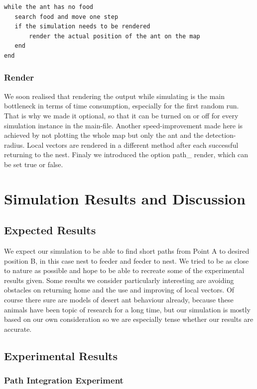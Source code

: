 \documentclass[11pt]{article}
\begin{document}
\begin{lstlisting}
while the ant has no food
   search food and move one step
   if the simulation needs to be rendered
       render the actual position of the ant on the map
   end
end
\end{lstlisting}

\subsubsection{Render}
We soon realised that rendering the output while simulating is the main bottleneck in terms of time consumption, especially for the first random run. That is why we made it optional, so that it can be turned on or off for every simulation instance in the main-file. Another speed-improvement made here is achieved by not plotting the whole map but only the ant and the detection-radius. Local vectors are rendered in a different method after each successful returning to the nest. Finaly we introduced the option path\_ render, which can be set true or false.

\newpage
\section{Simulation Results and Discussion}
\subsection{Expected Results}
We expect our simulation to be able to find short paths from Point A to desired position B, in this case nest to feeder and feeder to nest. We tried to be as close to nature as possible and hope to be able to recreate some of the experimental results given. Some results we consider particularly interesting are avoiding obstacles on returning home and the use and improving of local vectors. Of course there sure are models of desert ant behaviour already, because these animals have been topic of research for a long time, but our simulation is mostly based on our own consideration so we are especially tense whether our results are accurate.

\subsection{Experimental Results}

\subsubsection{Path Integration Experiment}
\end{document}
